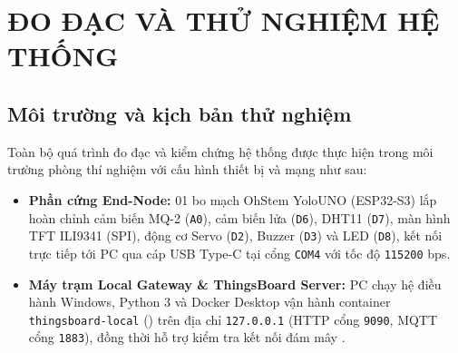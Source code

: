 
\section{ĐO ĐẠC VÀ THỬ NGHIỆM HỆ THỐNG}
\label{sec:do-dac-thu-nghiem}

\subsection{Môi trường và kịch bản thử nghiệm}
\label{subsec:moi-truong-kich-ban}

Toàn bộ quá trình đo đạc và kiểm chứng hệ thống được thực hiện trong môi trường phòng thí nghiệm với cấu hình thiết bị và mạng như sau:
\begin{itemize}[leftmargin=*, itemsep=2pt]
  \item \textbf{Phần cứng End-Node:} 01 bo mạch OhStem YoloUNO (ESP32-S3) lắp hoàn chỉnh cảm biến MQ-2 (\texttt{A0}), cảm biến lửa (\texttt{D6}), DHT11 (\texttt{D7}), màn hình TFT ILI9341 (SPI), động cơ Servo (\texttt{D2}), Buzzer (\texttt{D3}) và LED (\texttt{D8}), kết nối trực tiếp tới PC qua cáp USB Type-C tại cổng \texttt{COM4} với tốc độ \texttt{115200} bps.
  \item \textbf{Máy trạm Local Gateway \& ThingsBoard Server:} PC chạy hệ điều hành Windows, Python 3 và Docker Desktop vận hành container \texttt{thingsboard-local} () trên địa chỉ \texttt{127.0.0.1} (HTTP cổng \texttt{9090}, MQTT cổng \texttt{1883}), đồng thời hỗ trợ kiểm tra kết nối đám mây .
\end{itemize}

